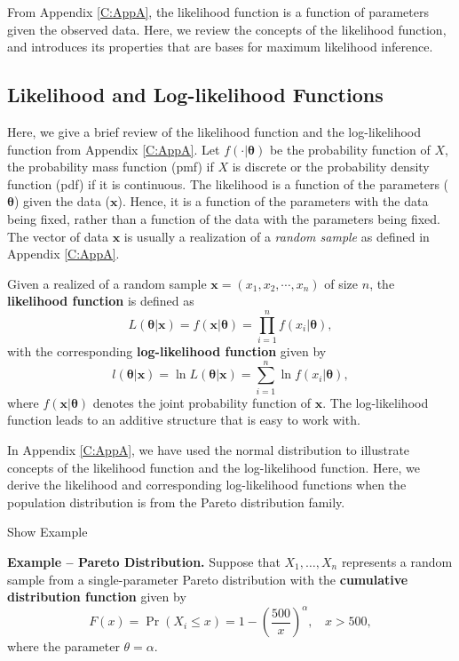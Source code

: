 \documentclass[]{book}
\theoremstyle{definition}
\theoremstyle{definition}
\theoremstyle{definition}
\theoremstyle{remark}
\begin{document}
From Appendix \ref{C:AppA}, the likelihood function is a function of
parameters given the observed data. Here, we review the concepts of the
likelihood function, and introduces its properties that are bases for
maximum likelihood inference.

\subsection{Likelihood and Log-likelihood
Functions}\label{likelihood-and-log-likelihood-functions}

Here, we give a brief review of the likelihood function and the
log-likelihood function from Appendix \ref{C:AppA}. Let
\(f(\cdot|\boldsymbol\theta)\) be the probability function of \(X\), the
probability mass function (pmf) if \(X\) is discrete or the probability
density function (pdf) if it is continuous. The likelihood is a function
of the parameters (\(\boldsymbol \theta\)) given the data
(\(\mathbf{x}\)). Hence, it is a function of the parameters with the
data being fixed, rather than a function of the data with the parameters
being fixed. The vector of data \(\mathbf{x}\) is usually a realization
of a \emph{random sample} as defined in Appendix \ref{C:AppA}.

Given a realized of a random sample \(\mathbf{x}=(x_1,x_2,\cdots,x_n)\)
of size \(n\), the \textbf{likelihood function} is defined as
\[L(\boldsymbol{\theta}|\mathbf{x})=f(\mathbf{x}|\boldsymbol{\theta})=\prod_{i=1}^nf(x_i|\boldsymbol{\theta}),\]
with the corresponding \textbf{log-likelihood function} given by
\[l(\boldsymbol{\theta}|\mathbf{x})=\ln L(\boldsymbol{\theta}|\mathbf{x})=\sum_{i=1}^n\ln f(x_i|\boldsymbol{\theta}),\]
where \(f(\mathbf{x}|\boldsymbol{\theta})\) denotes the joint
probability function of \(\mathbf{x}\). The log-likelihood function
leads to an additive structure that is easy to work with.

In Appendix \ref{C:AppA}, we have used the normal distribution to
illustrate concepts of the likelihood function and the log-likelihood
function. Here, we derive the likelihood and corresponding
log-likelihood functions when the population distribution is from the
Pareto distribution family.

Show Example

\hypertarget{EXM:S2b:LLK}{}
\textbf{Example -- Pareto Distribution.} Suppose that
\(X_1, \ldots, X_n\) represents a random sample from a single-parameter
Pareto distribution with the \textbf{cumulative distribution function}
given by
\[F(x) = \Pr(X_i\leq x)=1- \left(\frac{500}{x}\right)^{\alpha}, ~~~~ x>500,\]
where the parameter \(\theta = \alpha\).
\end{document}
